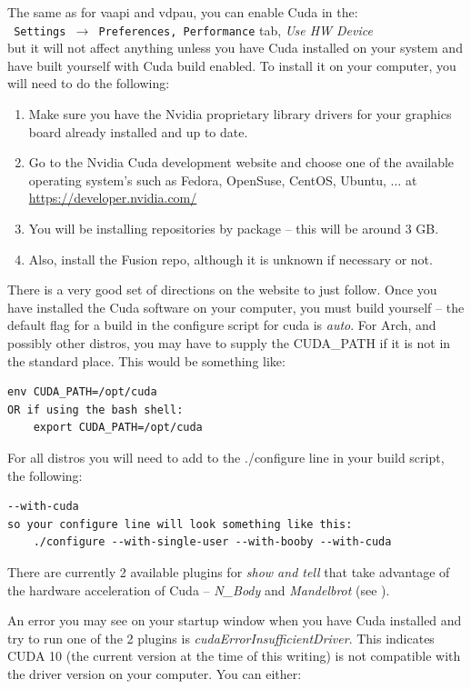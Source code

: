 The same as for vaapi and vdpau, you can enable Cuda in the:\\
\texttt{ Settings $\rightarrow$ Preferences, Performance} tab, \textit{Use HW Device}\\
but it will not affect anything unless you have Cuda installed on your system and have built \CGG{} yourself with Cuda build enabled.  To install it on your computer, you will need to do the following:

\begin{enumerate}
	\item Make sure you have the Nvidia proprietary library drivers for your graphics board already installed and up to date.
	\item Go to the Nvidia Cuda development website and choose one of the available operating system’s
	such as Fedora, OpenSuse, CentOS, Ubuntu, $\dots$ at   {\small \url{https://developer.nvidia.com/}}
	\item You will be installing repositories by package -- this will be around 3 GB.
	\item Also, install the Fusion repo, although it is unknown if necessary or not.
\end{enumerate}

There is a very good set of directions on the website to just follow.  Once you have installed the Cuda software on your computer, you must build \CGG{} yourself -- the default flag for a build in the configure script for cuda is \textit{auto}.  For Arch, and possibly other distros, you may have to supply the CUDA\_PATH if it is not in the standard place.  This would be
something like:


\begin{lstlisting}[numbers=none]
	env CUDA_PATH=/opt/cuda
OR if using the bash shell: 
	export CUDA_PATH=/opt/cuda
\end{lstlisting}
For all distros you will need to add to the ./configure line in your build script, the following:


\begin{lstlisting}[numbers=none]
	--with-cuda
so your configure line will look something like this:
	./configure --with-single-user --with-booby --with-cuda
\end{lstlisting}

There are currently 2 available plugins for \textit{show and tell} that take advantage of the hardware acceleration of Cuda -- \textit{N\_Body} and \textit{Mandelbrot} (see ).

An error you may see on your \CGG{} startup window when you have Cuda installed and try to run one of the 2 plugins is \textit{cudaErrorInsufficientDriver}.  This indicates CUDA 10 (the current version at the time of this writing) is not compatible with the driver version on your computer.  You can either:

